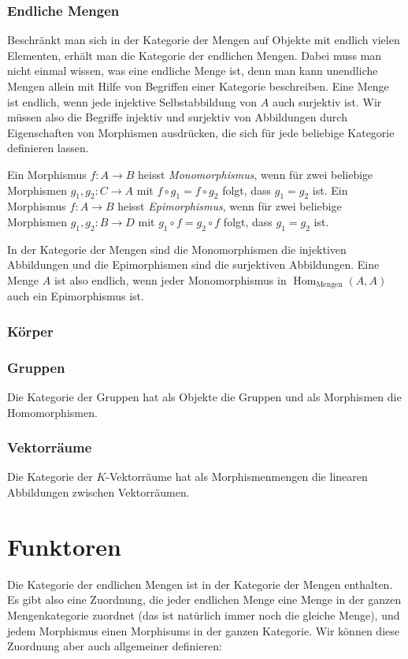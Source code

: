 \subsubsection{Endliche Mengen}
Beschränkt man sich in der Kategorie der Mengen auf Objekte mit
endlich vielen Elementen, erhält man die Kategorie der endlichen Mengen.
Dabei muss man nicht einmal wissen, was eine endliche Menge ist,
denn man kann unendliche Mengen allein mit Hilfe von Begriffen einer
Kategorie beschreiben.
Eine Menge ist endlich, wenn jede injektive Selbstabbildung von $A$ auch
surjektiv ist.
Wir müssen also die Begriffe injektiv und surjektiv von Abbildungen
durch Eigenschaften von Morphismen ausdrücken, die sich für jede beliebige
Kategorie definieren lassen.

\begin{definition}
Ein Morphismus $f\colon A\to B$ heisst {\em Monomorphismus}, wenn 
für zwei beliebige Morphismen $g_1,g_2\colon C\to A$ mit
$f\circ g_1=f\circ g_2$ folgt, dass $g_1=g_2$ ist.
Ein Morphismus $f\colon A\to B$ heisst {\em Epimorphismus}, wenn
für zwei beliebige Morphismen $g_1,g_2\colon B\to D$ mit
$g_1\circ f=g_2\circ f$ folgt, dass $g_1=g_2$ ist.
\end{definition}
%
%
In der Kategorie der Mengen sind die Monomorphismen die injektiven
Abbildungen und die Epimorphismen sind die surjektiven Abbildungen.
Eine Menge $A$ ist also endlich, wenn jeder Monomorphismus in
$\operatorname{Hom}_{\text{Mengen}}(A,A)$ auch ein Epimorphismus ist.

\subsubsection{Körper}

\subsubsection{Gruppen}
Die Kategorie der Gruppen hat als Objekte die Gruppen und als
Morphismen die Homomorphismen.

\subsubsection{Vektorräume}
Die Kategorie der $K$-Vektorräume hat als Morphismenmengen die linearen
Abbildungen zwischen Vektorräumen.

\section{Funktoren}
Die Kategorie der endlichen Mengen ist in der Kategorie der Mengen enthalten.
Es gibt also eine Zuordnung, die jeder endlichen Menge eine Menge in
der ganzen Mengenkategorie zuordnet (das ist natürlich immer noch die
gleiche Menge), und jedem Morphismus einen Morphisums in der ganzen
Kategorie.
Wir können diese Zuordnung aber auch allgemeiner definieren:

